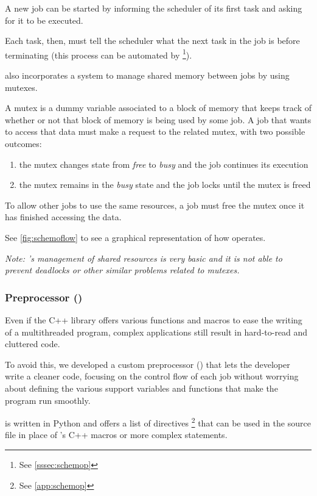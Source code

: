   A new job can be started by informing the scheduler of its first
  task and asking for it to be executed.

  Each task, then, must tell the scheduler what the next task in the
  job is before terminating (this process can be automated by
  \footnote{See \autoref{sssec:schemop}}).

  \ScheMo{} also incorporates a system to manage shared memory between
  jobs by using mutexes.

  A mutex is a dummy variable associated to a block of memory that
  keeps track of whether or not that block of memory is being used by
  some job. A job that wants to access that data must make a request
  to the related mutex, with two possible outcomes:
  \begin{enumerate}
    \item the mutex changes state from \textit{free} to
      \textit{busy} and the job continues its execution
    \item the mutex remains in the \textit{busy} state and the job
      locks until the mutex is freed
  \end{enumerate}

  To allow other jobs to use the same resources, a job must free the
  mutex once it has finished accessing the data.

  See \autoref{fig:schemoflow} to see a graphical representation
  of how \ScheMo{} operates.

  \textit{Note: \ScheMo{}'s management of shared resources is very
  basic and it is not able to prevent deadlocks or other similar
  problems related to mutexes.}
 
\subsubsection{\ScheMo{} Preprocessor ()}
\label{sssec:schemop}
  Even if the C++ library offers various functions and macros to
  ease the writing of a multithreaded program, complex applications
  still result in hard-to-read and cluttered code.

  To avoid this, we developed a custom preprocessor
  () that lets the developer write a cleaner code,
  focusing on the control flow of each job without worrying about
  defining the various support variables and functions that make the
  program run smoothly.

   is written in Python and offers a list of directives%
  \footnote{See \autoref{app:schemop}} that can be used in the
  source file in place of \ScheMo{}'s C++ macros or more complex statements.
  
